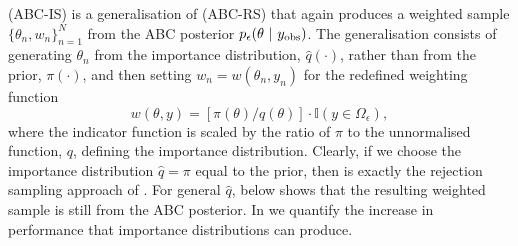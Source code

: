 \documentclass[review,demo]{siamonline190516}
\begin{document}
 (ABC-IS) is a generalisation of  (ABC-RS) that again produces a weighted sample $\{ \theta_n, w_n \}_{n=1}^N$ from the ABC posterior $p_\epsilon(\theta~|~y_{\mathrm{obs}})$.
The generalisation consists of generating $\theta_n$ from the importance distribution, $\hat q(\cdot)$, rather than from the prior, $\pi(\cdot)$, and then setting $w_n = w(\theta_n, y_n)$ for the redefined weighting function
\begin{equation}
 \label{eq:ImportanceWeight}
 w(\theta, y) = \left[ \pi(\theta) \big/ q(\theta) \right] \cdot \mathbb I(y \in \Omega_\epsilon),
\end{equation}
where the indicator function is scaled by the ratio of $\pi$ to the unnormalised function, $q$, defining the importance distribution.
Clearly, if we choose the importance distribution $\hat q = \pi$ equal to the prior, then  is exactly the rejection sampling approach of .
For general $\hat q$,  below shows that the resulting weighted sample is still from the ABC posterior.
In  we quantify the increase in performance that importance distributions can produce.

\begin{algorithm}
\caption{Importance sampling ABC (ABC-IS)}
\label{ABC:Importance}
\begin{algorithmic}[1]
\REPEAT{}
\end{algorithmic}
\end{algorithm}
\end{document}
